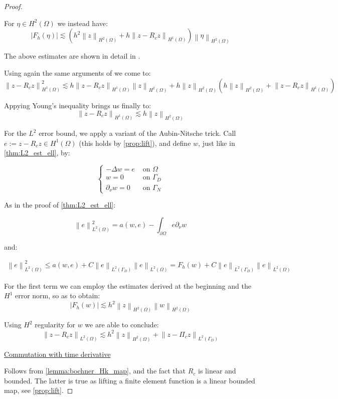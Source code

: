 \documentclass[english,a4paper,9pt,oneside]{scrbook}	%
\theoremstyle{break}
\newenvironment{mproof}[1][\proofname]{%
  \begin{proof}[#1]$ $\par\nobreak\ignorespaces
}{%
  \end{proof}
}
\renewcommand*{\proofname}{Proof}
\theoremstyle{remark}
\newcommand{\norm}[1]{\left\lVert#1\right\rVert}
\begin{document}
\begin{appendices}
\begin{mproof}
For $\eta \in H^2(\Omega)$ we instead have:
$$|F_h(\eta)|\lesssim \left ( h^2 \norm{z}_{H^2(\Omega)}+ h \norm{z-R_cz}_{H^1(\Omega)}\right)\norm{\eta}_{H^2(\Omega)}$$

The above estimates are shown in detail in \cite{ranner}.

Using again the same arguments of \cite{ranner} we come to:
$$\norm{z-R_cz}^2_{H^1(\Omega)}\lesssim h \norm{z-R_cz}_{H^1(\Omega)} \norm{z}_{H^2(\Omega)} + h \norm{z}_{H^2(\Omega)}(h\norm{z}_{H^2(\Omega)}+\norm{z-R_cz}_{H^1(\Omega)})$$

Appying Young's inequality brings us finally to:
$$\norm{z-R_cz}_{H^1(\Omega)}\lesssim h \norm{z}_{H^2(\Omega)} $$

For the $L^2$ error bound, we apply a variant of the Aubin-Nitsche trick. Call $e:= z - R_c z \in H^1(\Omega)$ (this holds by \cref{prop:lift}), and define $w$, just like in \cref{thm:L2_est_ell}, by:

$$
\left\{\begin{matrix}
-\Delta w = e & \text{ on } \Omega \\ 
w = 0 & \text{ on } \Gamma_D \\ 
\partial_\nu w = 0 & \text{ on } \Gamma_N 
\end{matrix}\right.
$$

As in the proof of \cref{thm:L2_est_ell}:

$$\norm{e}^2_{L^2(\Omega)} = a(w,e) - \int_{\partial \Omega} e \partial_\nu w  $$

and:

\begin{align*}
\norm{e}^2_{L^2(\Omega)} \leq a(w,e) + C \norm{e}_{L^2(\Gamma_D)}\norm{e}_{L^2( \Omega)} = F_h(w) + C \norm{e}_{L^2(\Gamma_D)}\norm{e}_{L^2( \Omega)}
\end{align*}

For the first term we can employ the estimates derived at the beginning and the $H^1$ error norm, so as to obtain:
$$|F_h(w)|\lesssim h^2\norm{z}_{H^2(\Omega)}\norm{w}_{H^2(\Omega)}$$

Using $H^2$ regularity for $w$ we are able to conclude:
$$\norm{z-R_c z}_{L^2(\Omega)}\lesssim h^2\norm{z}_{H^2(\Omega)} + \norm{z-\Pi_c z}_{L^2(\Gamma_D)} $$

\underline{Commutation with time derivative}

Follows from \cref{lemma:bochner_Hk_map}, and the fact that $R_c$ is linear and bounded. The latter is true as lifting a finite element function is a linear bounded map, see \cref{prop:lift}.


\end{mproof}
\end{appendices}
\end{document}
